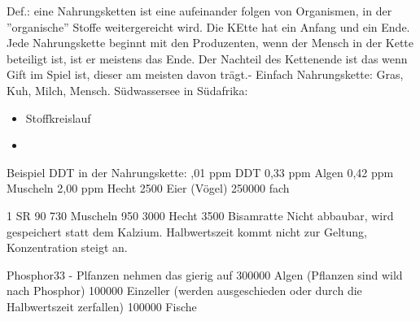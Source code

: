 \documentclass[a4paper]{article}
\begin{document}
Def.: eine Nahrungsketten ist eine aufeinander folgen von Organismen, in der ''organische'' Stoffe weitergereicht wird. Die KEtte hat ein Anfang und ein Ende. Jede Nahrungskette beginnt mit den Produzenten, wenn der Mensch in der Kette beteiligt ist, ist er meistens das Ende. Der Nachteil des Kettenende ist das wenn Gift im Spiel ist, dieser am meisten davon trägt.- Einfach Nahrungskette: Gras, Kuh, Milch, Mensch.
\newline
\newline
Südwassersee in Südafrika:
\begin{itemize}
\item Stoffkreislauf
\item 
\end{itemize}

Beispiel DDT in der Nahrungskette:
,01 ppm DDT
0,33 ppm Algen
0,42 ppm Muscheln
2,00 ppm Hecht
2500 Eier (Vögel)
250000 fach
\newline

1 SR 90
730 Muscheln
950 
3000 Hecht
3500 Bisamratte
\newline
Nicht abbaubar, wird gespeichert statt dem Kalzium. Halbwertszeit kommt nicht zur Geltung, Konzentration steigt an.


Phosphor33 - Plfanzen nehmen das gierig auf
300000 Algen (Pflanzen sind wild nach Phosphor)
100000 Einzeller (werden ausgeschieden oder durch die Halbwertszeit zerfallen)
100000 Fische
\end{document}
